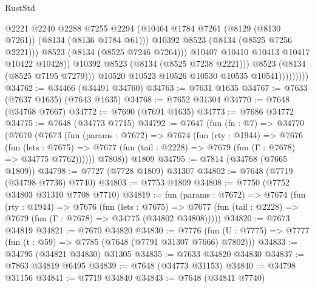\begin{lexlean}{RustStd}
\begin{coremodule}
                                  @2221
                                  @2240
                                  @2288
                                  @7255
                                  @2294
                                  (@10464
                                    @1784
                                    @7261
                                    (@8129 (@8130 @7261))
                                    (@8134 (@8136 @1784 @61)))
                                  @10392
                                  @8523
                                  (@8134 (@8525 @7256 @2221)))
                                @8523
                                (@8134 (@8525 @7246 @7264)))
                              @10407
                              @10410
                              @10413
                              @10417
                              @10422
                              @10428))
                          @10392
                          @8523
                          (@8134 (@8525 @7238 @2221)))
                        @8523
                        (@8134 (@8525 @7195 @7279)))
                      @10520
                      @10523
                      @10526
                      @10530
                      @10535
                      @10541)))))))))
@34762 := @34466 (@34491 @34760)
@34763 := @7631 @1635
@34767 := @7633 (@7637 @1635) (@7643 @1635)
@34768 := @7652 @31304
@34770 := @7648 (@34768 @7667)
@34772 := @7690 (@7691 @1635)
@34773 := @7686 @34772
@34775 := @7648 (@34773 @7715)
@34792 := @7647
    (fun (fn : @7) =>
    @34770
      (@7670
        (@7673
          (fun (params : @7672) =>
          @7674
            (fun (rty : @1944) =>
            @7676
              (fun (lets : @7675) =>
              @7677 (fun (tail : @2228) => @7679 (fun (Γ : @7678) => @34775 @7762))))))
        @7808))
    @1809
@34795 := @7814 (@34768 (@7665 @1809))
@34798 := @7727 (@7728 @1809) @31307
@34802 := @7648 (@7719 (@34798 @7736) @7740)
@34803 := @7753 @1809
@34808 := @7750 (@7752 @34803 @31310 @7708 @7710)
@34819 := fun (params : @7672) =>
  @7674
    (fun (rty : @1944) =>
    @7676
      (fun (lets : @7675) =>
      @7677 (fun (tail : @2228) => @7679 (fun (Γ : @7678) => @34775 (@34802 @34808)))))
@34820 := @7673 @34819
@34821 := @7670 @34820
@34830 := @7776
    (fun (U : @7775) => @7777 (fun (t : @59) => @7785 (@7648 (@7791 @31307 @7666) @7802)))
@34833 := @34795 (@34821 @34830) @31305
@34835 := @7633 @34820 @34830
@34837 := @7863 @34819 @6495
@34839 := @7648 (@34773 @31153)
@34840 := @34798 @31156
@34841 := @7719 @34840
@34843 := @7648 (@34841 @7740)

\end{coremodule}
\end{lexlean}
